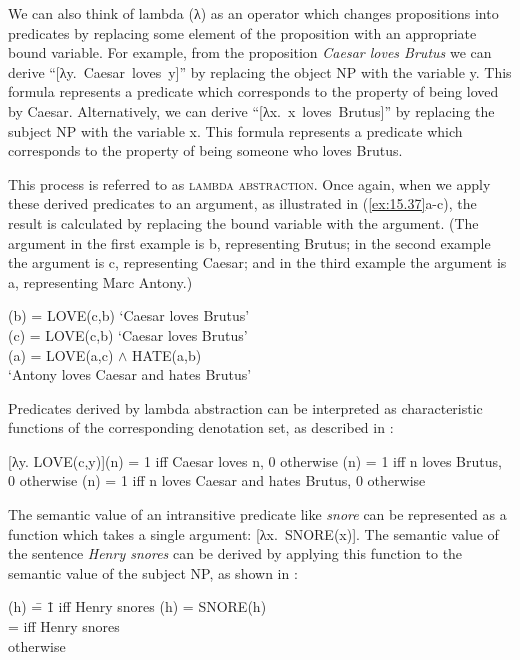 We can also think of lambda (λ) as an operator which changes propositions into predicates by replacing some element of the proposition with an appropriate bound variable. For example, from the proposition \textit{Caesar loves Brutus} we can derive “[λy.~Caesar~loves~y]” by replacing the object NP with the variable y. This formula represents a predicate which corresponds to the property of being loved by Caesar. Alternatively, we can derive “[λx.~x~loves~Brutus]” by replacing the subject NP with the variable x. This formula represents a predicate which corresponds to the property of being someone who loves Brutus.



This process is referred to as \textsc{lambda abstraction}. Once again, when we apply these derived predicates to an argument, as illustrated in (\ref{ex:15.37}a-c), the result is calculated by replacing the bound variable with the argument. (The argument in the first example is b, representing Brutus; in the second example the argument is c, representing Caesar; and in the third example the argument is a, representing Marc Antony.)


\ea \label{ex:15.37}
\ea [λy. LOVE(c,y)](b) = LOVE(c,b) ‘Caesar loves Brutus’\\
\ex [λx. LOVE(x,b)](c) = LOVE(c,b) ‘Caesar loves Brutus’\\
(a) = LOVE(a,c) $\wedge$ HATE(a,b)\\
\glt  ‘Antony loves Caesar and hates Brutus’
\z \z


Predicates derived by lambda abstraction can be interpreted as characteristic functions of the corresponding denotation set, as described in :


\ea \label{ex:15.38} 
\ea \label{ex:15.}  [λy. LOVE(c,y)](n) =  1 iff Caesar loves n,  0 otherwise
\ex   [λx. LOVE(x,b)](n) =  1 iff n loves Brutus,  0 otherwise
(n) =  1 iff n loves Caesar and hates Brutus,  0 otherwise
\z \z


The semantic value of an intransitive predicate like \textit{snore} can be represented as a function which takes a single argument: [λx.~SNORE(x)]. The semantic value of the sentence \textit{Henry snores} can be derived by applying this function to the semantic value of the subject NP, as shown in :


\ea \label{ex:15.39}
\begin{tabbing}\relax
[λx. SNORE(x)](h)  \= = \=  1 iff Henry snores \kill
[λx. SNORE(x)](h)  \> = \>  SNORE(h)\\
                   \> =  iff Henry snores\\
                   \>    otherwise
\end{tabbing}
\z


